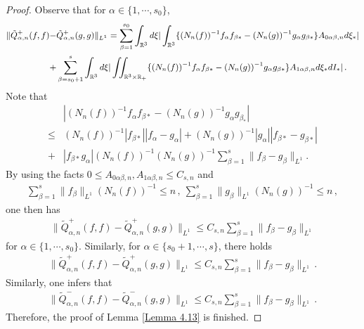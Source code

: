 \documentclass[reqno,11pt]{amsart}
\numberwithin{equation}{section}
\def\R{\mathbb{R}}
\begin{document}
\begin{proof}
Observe that for $\alpha \in \{1,\cdots ,s_0\}$, 
	\begin{equation*}{\small
		\begin{aligned}
			\Vert \tilde{Q}^+_{\alpha , n} (f,f) - & \tilde{Q}^+_{\alpha , n} (g,g ) \Vert_{L^1} =\sum \limits_{\beta =1}^{s_0}\int_{\R^3} d\xi |\int_{\R^3} \{(N_n (f))^{-1}  f_\alpha f_{\beta *} -(N_n (g))^{-1} g_\alpha  g_{\beta *}\} A_{0\alpha \beta ,n}d\xi_* | \\
			+& \sum \limits_{\beta =s_0+ 1}^{s} \int_{\R^3} d\xi |\iint_{\R^3\times \R_+} \{(N_n (f))^{-1}  f_\alpha f_{\beta *} -(N_n (g))^{-1} g_\alpha  g_{\beta *}\} A_{1\alpha \beta ,n }d\xi_* dI_*| \,.
		\end{aligned}}
	\end{equation*}
Note that
	\begin{equation*}
		\begin{aligned}
			&|(N_n (f))^{-1}  f_\alpha f_{\beta *} -(N_n (g))^{-1}  g_\alpha  g_{\beta_*} | \\
			\leq & (N_n (f))^{-1} | f_{\beta *} | |f_\alpha -g_\alpha | +(N_n (g))^{-1} | g_\alpha | |f_{\beta *}-g_{\beta *}| \\
			+ & | f_{\beta *} g_\alpha | (N_n (f))^{-1} (N_n (g))^{-1} \sum_{\beta = 1}^{s} \| f_\beta - g_\beta \|_{L^1}.
		\end{aligned}
	\end{equation*}
By using the facts $0 \leq A_{0 \alpha \beta, n} , A_{1 \alpha \beta, n} \leq C_{s,n} $ and 
\begin{equation*}
  \begin{aligned}
    \sum_{\beta = 1}^{s} \| f_\beta \|_{L^1} (N_n (f))^{-1} \leq n \,, \ \sum_{\beta = 1}^{s} \| g_\beta \|_{L^1} (N_n (g))^{-1} \leq n \,,
  \end{aligned}
\end{equation*}
one then has
\begin{equation*}
  \begin{aligned}
    \| \tilde{Q}_{\alpha, n}^+ (f, f) - \tilde{Q}_{\alpha, n}^+ (g, g) \|_{L^1} \leq C_{s,n} \sum_{\beta = 1}^{s} \| f_\beta - g_\beta \|_{L^1} 
  \end{aligned}
\end{equation*}
for $\alpha \in \{1,\cdots ,s_0\}$. Similarly, for $\alpha \in \{s_0 + 1,\cdots ,s\}$, there holds
\begin{equation*}
  \begin{aligned}
    \| \tilde{Q}_{\alpha, n}^+ (f, f) - \tilde{Q}_{\alpha, n}^+ (g, g) \|_{L^1} \leq C_{s,n} \sum_{\beta = 1}^{s} \| f_\beta - g_\beta \|_{L^1} \,.
  \end{aligned}
\end{equation*}
Similarly, one infers that
\begin{equation*}
  \begin{aligned}
    \| \tilde{Q}_{\alpha, n}^- (f, f) - \tilde{Q}_{\alpha, n}^- (g, g) \|_{L^1} \leq C_{s,n} \sum_{\beta = 1}^{s} \| f_\beta - g_\beta \|_{L^1} \,.
  \end{aligned}
\end{equation*}
Therefore, the proof of Lemma \ref{Lemma 4.13} is finished.
	\end{proof}
\end{document}
